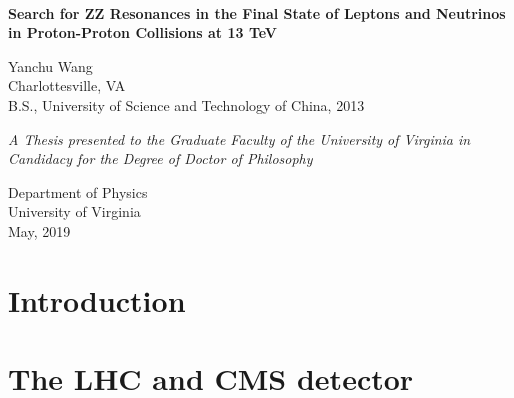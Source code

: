 \documentclass[14pt,a4paper,oldfontcommands]{memoir}
\begin{document}
%
%
\thispagestyle{empty}

{%
\centering
\Large

~\vspace{\fill}

\textbf{\huge 
Search for ZZ Resonances in the Final State of Leptons and Neutrinos in Proton-Proton Collisions at 13 TeV
}

\vspace{0.5cm}

{\LARGE
Yanchu Wang\\
}
Charlottesville, VA\\[1em]

B.S., University of Science and Technology of China, 2013

\vspace{2.5cm}
\vspace{\fill}
\textrm{\textit{A Thesis presented to the Graduate Faculty of the University of Virginia in Candidacy for the Degree of Doctor of Philosophy}}

\vspace{2.5cm}


\vspace{\fill}
Department of Physics\\[1em]
University of Virginia\\
May, 2019

}%

\cleardoublepage

%

\clearpage
\tableofcontents*

\clearpage


\chapter{Introduction}

\chapter{The LHC and CMS detector}

\end{document}
